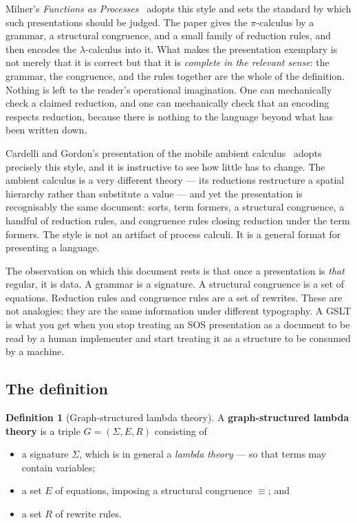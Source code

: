 \documentclass[11pt]{article}
\theoremstyle{definition}
\newtheorem{definition}{Definition}[section]
\theoremstyle{plain}
\theoremstyle{remark}
\begin{document}
Milner's \emph{Functions as Processes}~\cite{Milner1992} adopts this style and sets the
standard by which such presentations should be judged. The paper gives the
$\pi$-calculus by a grammar, a structural congruence, and a small family of reduction
rules, and then encodes the $\lambda$-calculus into it. What makes the presentation
exemplary is not merely that it is correct but that it is \emph{complete in the
relevant sense}: the grammar, the congruence, and the rules together are the whole of
the definition. Nothing is left to the reader's operational imagination. One can
mechanically check a claimed reduction, and one can mechanically check that an encoding
respects reduction, because there is nothing to the language beyond what has been
written down.

Cardelli and Gordon's presentation of the mobile ambient
calculus~\cite{CardelliGordon2000} adopts precisely this style, and it is instructive
to see how little has to change. The ambient calculus is a very different theory ---
its reductions restructure a spatial hierarchy rather than substitute a value --- and
yet the presentation is recognisably the same document: sorts, term formers, a
structural congruence, a handful of reduction rules, and congruence rules closing
reduction under the term formers. The style is not an artifact of process calculi. It
is a general format for presenting a language.

The observation on which this document rests is that once a presentation is
\emph{that} regular, it is data. A grammar is a signature. A structural congruence is a
set of equations. Reduction rules and congruence rules are a set of rewrites. These are
not analogies; they are the same information under different typography. A GSLT is what
you get when you stop treating an SOS presentation as a document to be read by a human
implementer and start treating it as a structure to be consumed by a machine.

\subsection{The definition}

\begin{definition}[Graph-structured lambda theory]
\label{def:gslt}
A \textbf{graph-structured lambda theory} is a triple $G = (\Sigma, E, R)$ consisting of
\begin{itemize}[leftmargin=2em]
  \item a signature $\Sigma$, which is in general a \emph{lambda theory} --- so that
    terms may contain variables;
  \item a set $E$ of equations, imposing a structural congruence $\equiv$; and
  \item a set $R$ of rewrite rules.
\end{itemize}
\end{definition}
\end{document}
